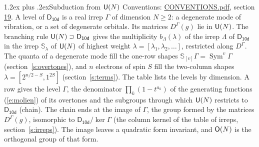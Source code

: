 \documentclass[10pt,a4paper]{article}
\makeatletter
\renewcommand\section{\@startsection{section}{1}{\z@}{-3ex plus -1ex minus -.2ex}%
  {1.2ex plus .2ex}{\normalfont\large\sffamily\bfseries\color{parttitle}}}
\numberwithin{equation}{section}
\newcommand{\grp}[1]{\mathsf{#1}}
\newcommand{\repD}[1]{D^{#1}}
\newcommand{\schur}[1]{\mathbb{S}_{#1}}
\newcommand{\shape}[1]{[#1]}
\makeatother
\begin{document}
\section{Subduction from \texorpdfstring{$\grp{U(\mathnormal{N})}$}{U(N)}}\label{s:unitary}
Conventions: \href{../../CONVENTIONS.pdf}{CONVENTIONS.pdf}, section \href{../../CONVENTIONS.pdf\#conv.19}{19}.
\leavevmode\label{n:local.level.dimension}A level of $\grp{D_{10d}}$ is a real irrep $\Gamma$ of dimension $N \ge 2$: a degenerate mode of vibration, or a set of degenerate orbitals. \label{n:group.unitary}Its matrices $\repD{\Gamma}(g)$ lie in $\grp{U(\mathnormal{N})}$. \label{n:irrep.schur}\label{n:shape.partition}\label{n:local.partition}\label{n:function.multiplicity.unitary}The branching rule $\grp{U(\mathnormal{N})} \supset \grp{D_{10d}}$ gives the multiplicity $b_\Lambda(\lambda)$ of the irrep $\Lambda$ of $\grp{D_{10d}}$ in the irrep $\schur{\lambda}$ of $\grp{U(\mathnormal{N})}$ of highest weight $\lambda = \shape{\lambda_1, \lambda_2, \dots}$, restricted along $\repD{\Gamma}$. \label{n:local.partition.power}\label{n:local.electrons}\label{n:local.spin}The quanta of a degenerate mode fill the one-row shapes $\schur{\shape{v}}\Gamma = \operatorname{Sym}^{v}\Gamma$ (section~\ref{s:overtones}), and $n$ electrons of spin $S$ fill the two-column shapes $\lambda = \shape{2^{n/2-S}, 1^{2S}}$ (section~\ref{s:terms}).
The table lists the levels by dimension. \label{n:head.level}\label{n:head.denominator}\label{n:index.overtone.denominator}\label{n:head.chain}A row gives the level $\Gamma$, the denominator $\prod_k (1 - t^{a_k})$ of the generating functions (\ref{e:molien}) of its overtones and the subgroups through which $\grp{U(\mathnormal{N})}$ restricts to $\grp{D_{10d}}$ (chain). The chain ends at the image of $\Gamma$, the group formed by the matrices $\repD{\Gamma}(g)$, isomorphic to $\grp{D_{10d}}/\ker\Gamma$ (the column kernel of the table of irreps, section~\ref{s:irreps}). The image leaves a quadratic form invariant, and $\grp{O(\mathnormal{N})}$ is the orthogonal group of that form.
\end{document}
